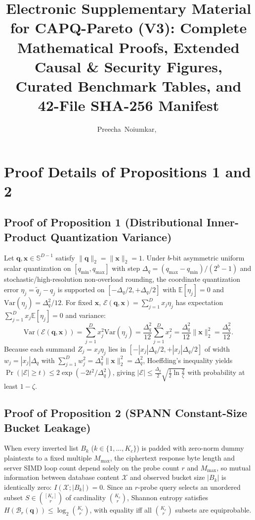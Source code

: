 \documentclass[10pt,journal,compsoc]{IEEEtran}
\begin{document}
\title{Electronic Supplementary Material for CAPQ-Pareto (V3): Complete Mathematical Proofs, Extended Causal \& Security Figures, Curated Benchmark Tables, and 42-File SHA-256 Manifest}
\author{Preecha~Noiumkar,~%
}
\maketitle

\section{Proof Details of Propositions 1 and 2}
\subsection{Proof of Proposition 1 (Distributional Inner-Product Quantization Variance)}
Let $\mathbf{q}, \mathbf{x} \in \mathbb{S}^{D-1}$ satisfy $\|\mathbf{q}\|_2 = \|\mathbf{x}\|_2 = 1$. Under $b$-bit asymmetric uniform scalar quantization on $[q_{\min}, q_{\max}]$ with step $\Delta_q = (q_{\max}-q_{\min})/(2^b - 1)$ and stochastic/high-resolution non-overload rounding, the coordinate quantization error $\eta_j = \tilde{q}_j - q_j$ is supported on $[-\Delta_q/2, +\Delta_q/2]$ with $\mathbb{E}[\eta_j]=0$ and $\mathrm{Var}(\eta_j)=\Delta_q^2/12$. For fixed $\mathbf{x}$, $\mathcal{E}(\mathbf{q},\mathbf{x}) = \sum_{j=1}^D x_j \eta_j$ has expectation $\sum_{j=1}^D x_j \mathbb{E}[\eta_j] = 0$ and variance:
\[
\mathrm{Var}(\mathcal{E}(\mathbf{q},\mathbf{x})) = \sum_{j=1}^D x_j^2 \mathrm{Var}(\eta_j) = \frac{\Delta_q^2}{12} \sum_{j=1}^D x_j^2 = \frac{\Delta_q^2}{12}\|\mathbf{x}\|_2^2 = \frac{\Delta_q^2}{12}.
\]
Because each summand $Z_j = x_j \eta_j$ lies in $[-|x_j|\Delta_q/2, +|x_j|\Delta_q/2]$ of width $w_j = |x_j|\Delta_q$ with $\sum_{j=1}^D w_j^2 = \Delta_q^2 \|\mathbf{x}\|_2^2 = \Delta_q^2$, Hoeffding's inequality yields $\Pr(|\mathcal{E}| \ge t) \le 2\exp(-2t^2/\Delta_q^2)$, giving $|\mathcal{E}| \le \frac{\Delta_q}{2}\sqrt{\frac{1}{2}\ln\frac{2}{\zeta}}$ with probability at least $1-\zeta$.

\subsection{Proof of Proposition 2 (SPANN Constant-Size Bucket Leakage)}
When every inverted list $B_k$ ($k \in \{1,\dots,K_c\}$) is padded with zero-norm dummy plaintexts to a fixed multiple $M_{\max}$, the ciphertext response byte length and server SIMD loop count depend solely on the probe count $r$ and $M_{\max}$, so mutual information between database content $\mathcal{X}$ and observed bucket size $|B_k|$ is identically zero: $I(\mathcal{X}; |B_k|) = 0$. Since an $r$-probe query selects an unordered subset $S \in \binom{[K_c]}{r}$ of cardinality $\binom{K_c}{r}$, Shannon entropy satisfies $H(\mathcal{B}_r(\mathbf{q})) \le \log_2 \binom{K_c}{r}$, with equality iff all $\binom{K_c}{r}$ subsets are equiprobable.
\end{document}
